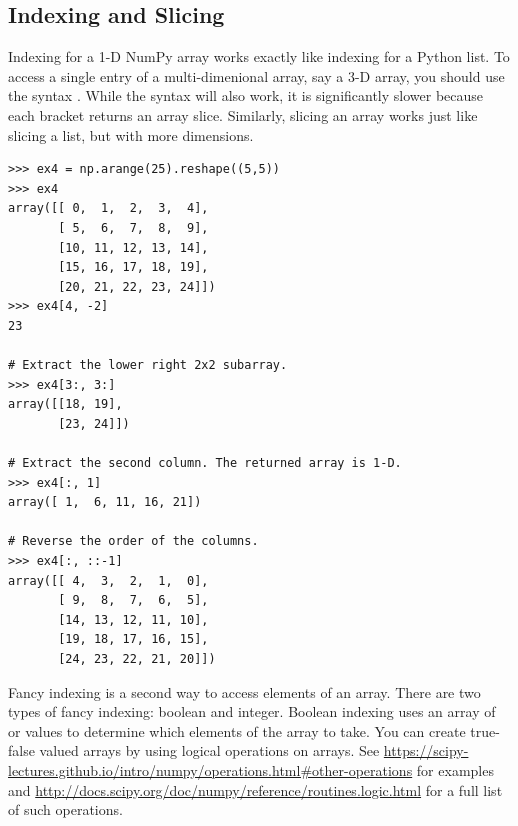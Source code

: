 \subsection*{Indexing and Slicing} 
Indexing for a 1-D NumPy array works exactly like indexing for a Python list. To access a single entry of a multi-dimenional array, say a 3-D array, you should use the syntax . While the syntax  will also work, it is significantly slower because each bracket returns an array slice. Similarly, slicing an array works just like slicing a list, but with more dimensions.
\begin{lstlisting}
>>> ex4 = np.arange(25).reshape((5,5)) 
>>> ex4
array([[ 0,  1,  2,  3,  4],
       [ 5,  6,  7,  8,  9],
       [10, 11, 12, 13, 14],
       [15, 16, 17, 18, 19],
       [20, 21, 22, 23, 24]])
>>> ex4[4, -2]
23

# Extract the lower right 2x2 subarray.
>>> ex4[3:, 3:] 
array([[18, 19],
       [23, 24]])
       
# Extract the second column. The returned array is 1-D.
>>> ex4[:, 1] 
array([ 1,  6, 11, 16, 21]) 

# Reverse the order of the columns.
>>> ex4[:, ::-1] 
array([[ 4,  3,  2,  1,  0],
       [ 9,  8,  7,  6,  5],
       [14, 13, 12, 11, 10],
       [19, 18, 17, 16, 15],
       [24, 23, 22, 21, 20]])
\end{lstlisting}

Fancy indexing is a second way to access elements of an array. There are two types of fancy indexing: boolean and integer. 
Boolean indexing uses an array of  or  values to 
determine which elements of the array to take. You can create true-false valued arrays by using logical operations on arrays. See \url{https://scipy-lectures.github.io/intro/numpy/operations.html#other-operations} for examples and \url{http://docs.scipy.org/doc/numpy/reference/routines.logic.html} for a full list of such operations.



